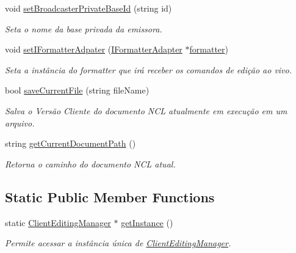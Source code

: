 \begin{DoxyCompactItemize}
void \hyperlink{classbr_1_1ufscar_1_1lince_1_1ginga_1_1wac_1_1editing_1_1ClientEditingManager_ae80834b5a0aa0ffdfb399a85f92b9bd5}{setBroadcasterPrivateBaseId} (string id)
\begin{DoxyCompactList}\small\item\em Seta o nome da base privada da emissora. \item\end{DoxyCompactList}\item 
void \hyperlink{classbr_1_1ufscar_1_1lince_1_1ginga_1_1wac_1_1editing_1_1ClientEditingManager_a07b41ca3cb59e493972d73c8f8e724b8}{setIFormatterAdpater} (\hyperlink{classbr_1_1ufscar_1_1lince_1_1ginga_1_1wac_1_1editing_1_1IFormatterAdapter}{IFormatterAdapter} $\ast$\hyperlink{classbr_1_1ufscar_1_1lince_1_1ginga_1_1wac_1_1editing_1_1ClientEditingManager_a49d8d70cee155e1d15c5da2cbb107777}{formatter})
\begin{DoxyCompactList}\small\item\em Seta a instância do formatter que irá receber os comandos de edição ao vivo. \item\end{DoxyCompactList}\item 
bool \hyperlink{classbr_1_1ufscar_1_1lince_1_1ginga_1_1wac_1_1editing_1_1ClientEditingManager_a968a7252444aa05bb471f47e4c554d19}{saveCurrentFile} (string fileName)
\begin{DoxyCompactList}\small\item\em Salva o Versão Cliente do documento NCL atualmente em execução em um arquivo. \item\end{DoxyCompactList}\item 
string \hyperlink{classbr_1_1ufscar_1_1lince_1_1ginga_1_1wac_1_1editing_1_1ClientEditingManager_aa305ed84ccf3c46501623df103d7a7e0}{getCurrentDocumentPath} ()
\begin{DoxyCompactList}\small\item\em Retorna o caminho do documento NCL atual. \item\end{DoxyCompactList}\end{DoxyCompactItemize}
\subsection*{Static Public Member Functions}
\begin{DoxyCompactItemize}
\item 
static \hyperlink{classbr_1_1ufscar_1_1lince_1_1ginga_1_1wac_1_1editing_1_1ClientEditingManager}{ClientEditingManager} $\ast$ \hyperlink{classbr_1_1ufscar_1_1lince_1_1ginga_1_1wac_1_1editing_1_1ClientEditingManager_ad72c33ccec250438af9b2c489634c42d}{getInstance} ()
\begin{DoxyCompactList}\small\item\em Permite acessar a instância única de \hyperlink{classbr_1_1ufscar_1_1lince_1_1ginga_1_1wac_1_1editing_1_1ClientEditingManager}{ClientEditingManager}. \item\end{DoxyCompactList}\end{DoxyCompactItemize}
